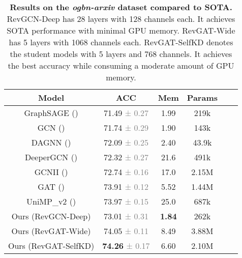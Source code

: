 \documentclass{article}
\begin{document}
\begin{table}[!htb]
\vspace{-8pt}
\centering
\setlength{\tabcolsep}{1pt}
\caption{\textbf{Results on the \emph{ogbn-arxiv} dataset compared to SOTA.} RevGCN-Deep has 28 layers with 128 channels each. It achieves SOTA performance with minimal GPU memory. RevGAT-Wide has 5 layers with 1068 channels each. RevGAT-SelfKD denotes the student models with 5 layers and 768 channels. It achieves the best accuracy while consuming a moderate amount of GPU memory.}
\vspace{2pt}
\begin{tabular}{cccccc}
\toprule
  \label{table:ogbn_arxiv_sota}
  \centering
Model & ACC 
& Mem 
& Params \\
\midrule
GraphSAGE (\citeauthor{hamilton2017inductive}) & 71.49 \textcolor{gray}{\small{± 0.27}}
& 1.99
& 219k \\
GCN (\citeauthor{kipf2017semi}) & 71.74 \textcolor{gray}{\small{± 0.29}}
& 1.90 
& 143k \\
DAGNN (\citeauthor{liu2020towards}) & 72.09 \textcolor{gray}{\small{± 0.25}}
& 2.40 
& 43.9k \\
DeeperGCN (\citeauthor{li2020deepergcn}) & 72.32 \textcolor{gray}{\small{± 0.27}}
& 21.6 
& 491k \\
GCNII (\citeauthor{chen2020simple}) & 72.74 \textcolor{gray}{\small{± 0.16}}
& 17.0
& 2.15M \\
GAT (\citeauthor{veli2018gat}) & 73.91 \textcolor{gray}{\small{± 0.12}}
& 5.52
& 1.44M \\
UniMP\_v2 (\citeauthor{shi2020masked}) & 73.97 \textcolor{gray}{\small{± 0.15}}
& 25.0
& 687k \\
\midrule
Ours (RevGCN-Deep) & 73.01 \textcolor{gray}{\small{± 0.31}}
& \textbf{1.84}
& 262k \\
Ours (RevGAT-Wide) & 74.05 \textcolor{gray}{\small{± 0.11}} & 8.49  & 3.88M \\
Ours (RevGAT-SelfKD) & \textbf{74.26} \textcolor{gray}{\small{± 0.17}} & 6.60  & 2.10M
\\
\bottomrule
\end{tabular}
\end{table}
\end{document}
